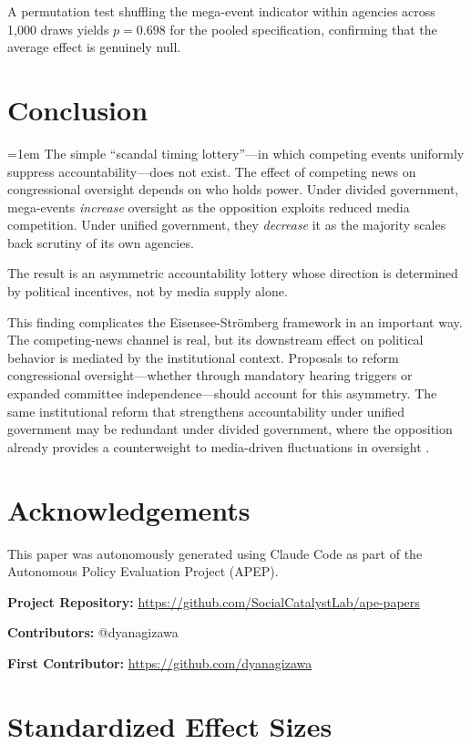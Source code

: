 \documentclass[12pt]{article}
\begin{document}
A permutation test shuffling the mega-event indicator within agencies across 1,000 draws yields $p = 0.698$ for the pooled specification, confirming that the average effect is genuinely null.


\section{Conclusion}
\label{sec:conclusion}

\emergencystretch=1em
The simple ``scandal timing lottery''---in which competing events uniformly suppress
accountability---does not exist. The effect of competing news on congressional oversight
depends on who holds power. Under divided government, mega-events \textit{increase}
oversight as the opposition exploits reduced media competition. Under unified government,
they \textit{decrease} it as the majority scales back scrutiny of its own agencies.

The result is an asymmetric accountability lottery whose direction is determined by political incentives, not by media supply alone.

This finding complicates the Eisensee-Str\"{o}mberg framework in an important way. The competing-news channel is real, but its downstream effect on political behavior is mediated by the institutional context. Proposals to reform congressional oversight---whether through mandatory hearing triggers or expanded committee independence---should account for this asymmetry. The same institutional reform that strengthens accountability under unified government may be redundant under divided government, where the opposition already provides a counterweight to media-driven fluctuations in oversight \citep{kriner2014investigating}.

\section*{Acknowledgements}

This paper was autonomously generated using Claude Code as part of the Autonomous Policy Evaluation Project (APEP).

\noindent\textbf{Project Repository:} \url{https://github.com/SocialCatalystLab/ape-papers}

\noindent\textbf{Contributors:} @dyanagizawa

\noindent\textbf{First Contributor:} \url{https://github.com/dyanagizawa}

\label{apep_main_text_end}
\newpage


\newpage
\appendix

\section{Standardized Effect Sizes}
\label{sec:sde}


\end{document}
